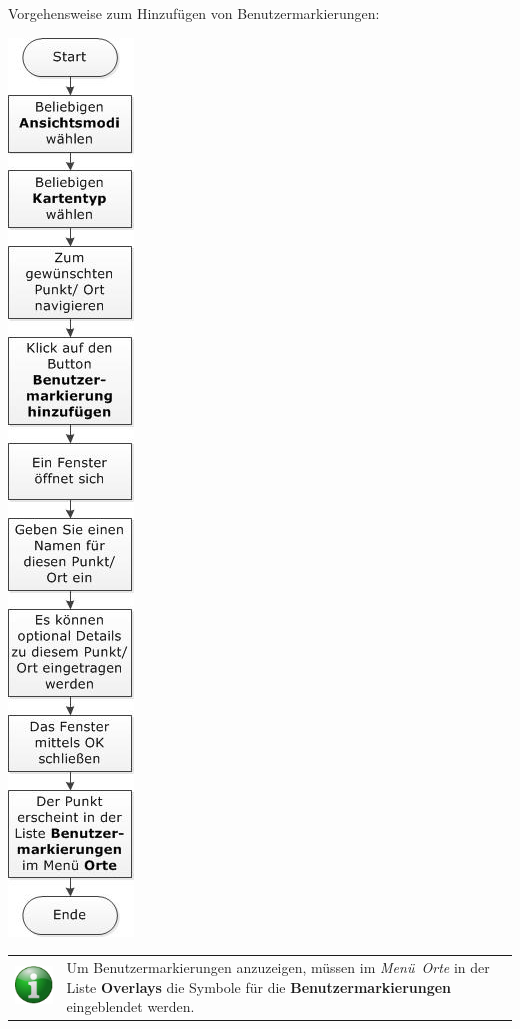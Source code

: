 \documentclass[10pt]{scrreprt}
\newcommand{\textref}[1]{\mbox{\raisebox{0.1ex}{\small$\rightarrow$ }\textit{#1}}}
\begin{document}
\vspace{3mm}
Vorgehensweise zum Hinzufügen von Benutzermarkierungen:
\vspace{3mm}
\begin{center}
\includegraphics[scale=0.7]{images/benutzermarkierungsetzen.jpeg}
\end{center}

\vspace{3mm}
\begin{tabular}{>{\centering \arraybackslash}m{1cm} m{14cm}}
\includegraphics[scale=0.5]{images/info.eps} & Um Benutzermarkierungen anzuzeigen, müssen im \textref{Menü Orte} in der Liste \textbf{Overlays} die Symbole für die \textbf{Benutzermarkierungen} eingeblendet werden.
\end{tabular}
\end{document}
